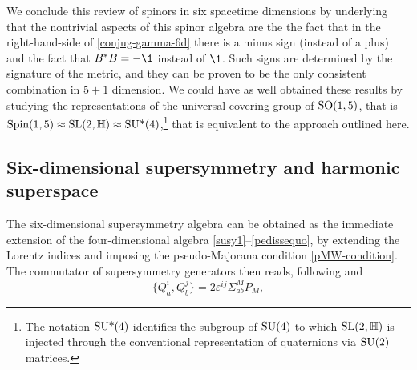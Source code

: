 We conclude this review of spinors in six spacetime dimensions by underlying that the nontrivial aspects of this spinor algebra are the the fact that in the right-hand-side of \eqref{conjug-gamma-6d} there is a minus sign (instead of a plus) and the fact that $B^*B = -\1$ instead of $\1$. Such signs are determined by the signature of the metric, and they can be proven to be the only consistent combination in $5+1$ dimension. We could have as well  obtained these results by studying the representations of the universal covering group of ${ \text{SO} }(1,5)$, that is \({ \text{Spin} }(1,5) \approx { \text{SL} }(2,\mathbb{H}) \approx { \text{SU*} }(4) \),\footnote{The notation ${ \text{SU*} }(4)$ identifies the subgroup of ${ \text{SU} }(4)$ to which \( { \text{SL} }(2,\mathbb{H}) \) is injected through the conventional representation of quaternions via \( { \text{SU} }(2) \) matrices.} that is equivalent to the approach outlined here.







\subsection{Six-dimensional supersymmetry and harmonic superspace}

The six-dimensional supersymmetry algebra can be obtained as the immediate extension of the four-dimensional algebra \eqref{susy1}--\eqref{pedissequo}, by extending the Lorentz indices and imposing the pseudo-Majorana condition \eqref{pMW-condition}.
The commutator of supersymmetry generators then reads, following \cite[p.\ 32]{Galperin:book} and \cite{Howe:1983fr}
\begin{equation}\label{6d-susy-alg}
	\{Q_{a}^i, Q_{b}^j\} = 2 \varepsilon^{ij} \Sigma^M_{ab} P_M,
%
%
\end{equation}

